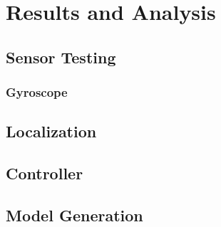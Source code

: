 \chapter{Results and Analysis\label{ch:results}}

\section{Sensor Testing}

	\subsection{Gyroscope}

\section{Localization}

\section{Controller}

\section{Model Generation}
